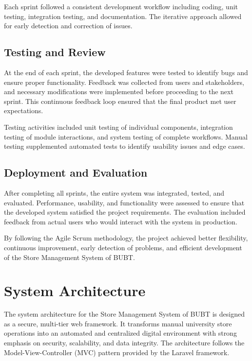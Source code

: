 Each sprint followed a consistent development workflow including coding, unit testing, integration testing, and documentation. The iterative approach allowed for early detection and correction of issues.

\subsection{Testing and Review}

At the end of each sprint, the developed features were tested to identify bugs and ensure proper functionality. Feedback was collected from users and stakeholders, and necessary modifications were implemented before proceeding to the next sprint. This continuous feedback loop ensured that the final product met user expectations.

Testing activities included unit testing of individual components, integration testing of module interactions, and system testing of complete workflows. Manual testing supplemented automated tests to identify usability issues and edge cases.

\subsection{Deployment and Evaluation}

After completing all sprints, the entire system was integrated, tested, and evaluated. Performance, usability, and functionality were assessed to ensure that the developed system satisfied the project requirements. The evaluation included feedback from actual users who would interact with the system in production.

By following the Agile Scrum methodology, the project achieved better flexibility, continuous improvement, early detection of problems, and efficient development of the Store Management System of BUBT.

\section{System Architecture}

The system architecture for the Store Management System of BUBT is designed as a secure, multi-tier web framework. It transforms manual university store operations into an automated and centralized digital environment with strong emphasis on security, scalability, and data integrity. The architecture follows the Model-View-Controller (MVC) pattern provided by the Laravel framework.

